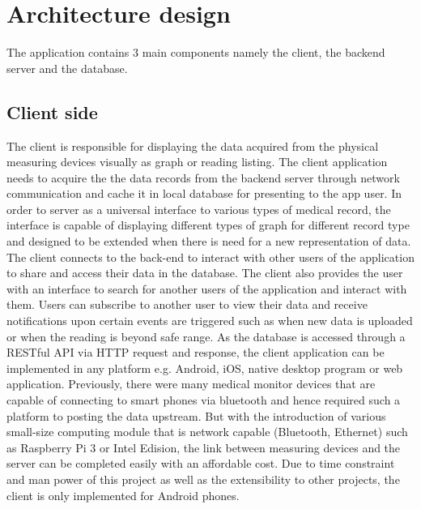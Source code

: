 \section{Architecture design}
\label{sec:Architecture design}
The application contains 3 main components namely the client, the backend server and the database.

\subsection{Client side}
The client is responsible for displaying the data acquired from the physical measuring devices visually as graph or
reading listing. The client application needs to acquire the the data records from the backend server through network
communication and cache it in local database for presenting to the app user. In order to server as a universal interface to
various types of medical record, the interface is capable of displaying different types of graph for different record
type and designed to be extended when there is need for a new representation of data. The client connects 
to the back-end to interact with other users of the application to share and access their data in the database. The
client also provides the user with an interface to search for another users of the application and interact with them.
Users can subscribe to another user to view their data and receive notifications upon certain events are triggered such
as when new data is uploaded or when the reading is beyond safe range. As the database is accessed through a RESTful API
via HTTP request and response, the client application can be implemented in any platform e.g. Android, iOS, native
desktop program or web application. Previously, there were many medical monitor devices that are capable of connecting
to smart phones via bluetooth and hence required such a platform to posting the data upstream. But with the introduction
of various small-size computing module that is network capable (Bluetooth, Ethernet) such as Raspberry Pi 3 or Intel
Edision, the link between measuring devices and the server can be completed easily with an affordable cost. Due to time
constraint and man power of this project as well as the extensibility to other projects, the client is only implemented
for Android phones.

